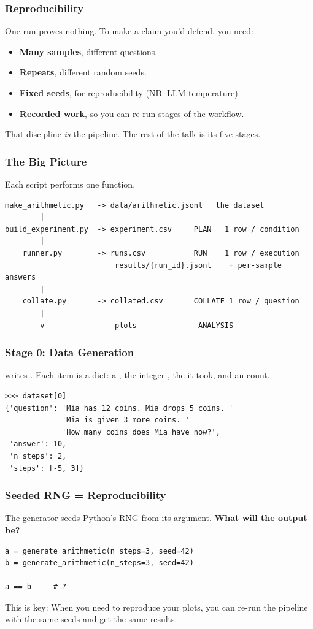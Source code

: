 \documentclass{beamer}
\begin{document}
\begin{frame}
    \frametitle{Reproducibility}
    One run proves nothing. To make a claim you'd defend, you need:
    \begin{itemize}
        \item \textbf{Many samples}, different questions.
        \item \textbf{Repeats}, different random seeds.
        \item \textbf{Fixed seeds}, for reproducibility (NB: LLM temperature).
        \item \textbf{Recorded work}, so you can re-run stages of the workflow.
    \end{itemize}

    \bigskip

    That discipline \emph{is} the pipeline. The rest of the talk is its five
    stages.
\end{frame}

\begin{frame}[fragile]
    \frametitle{The Big Picture}
    Each script performs one function.
    \begin{lstlisting}[style=demo]
make_arithmetic.py   -> data/arithmetic.jsonl   the dataset
        |
build_experiment.py  -> experiment.csv     PLAN   1 row / condition
        |
    runner.py        -> runs.csv           RUN    1 row / execution
                         results/{run_id}.jsonl    + per-sample answers
        |
    collate.py       -> collated.csv       COLLATE 1 row / question
        |
        v                plots              ANALYSIS
    \end{lstlisting}
\end{frame}

\begin{frame}[fragile]
    \frametitle{Stage 0: Data Generation}
     writes . Each item
    is a dict: a , the integer , the 
    it took, and an  count.
    \begin{lstlisting}[style=demo]
>>> dataset[0]
{'question': 'Mia has 12 coins. Mia drops 5 coins. '
             'Mia is given 3 more coins. '
             'How many coins does Mia have now?',
 'answer': 10,
 'n_steps': 2,
 'steps': [-5, 3]}
    \end{lstlisting}
\end{frame}

\begin{frame}[fragile]
    \frametitle{Seeded RNG = Reproducibility}
    The generator seeds Python's RNG from its  argument.
    \textbf{What will the output be?}
    \begin{lstlisting}[style=demo]
a = generate_arithmetic(n_steps=3, seed=42)
b = generate_arithmetic(n_steps=3, seed=42)

a == b     # ?
    \end{lstlisting}

    \bigskip

    This is key: When you need to reproduce your plots, you can re-run the pipeline with the same seeds and get the same results.
\end{frame}
\end{document}
